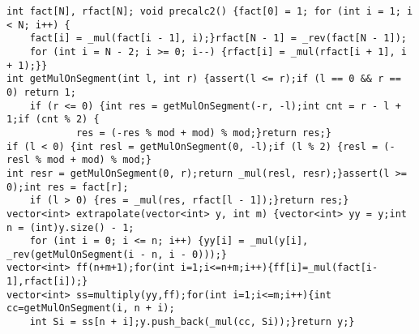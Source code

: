 \documentclass[12pt]{article}
\begin{document}
\begin{verbatim}
int fact[N], rfact[N]; void precalc2() {fact[0] = 1; for (int i = 1; i < N; i++) {
    fact[i] = _mul(fact[i - 1], i);}rfact[N - 1] = _rev(fact[N - 1]);
    for (int i = N - 2; i >= 0; i--) {rfact[i] = _mul(rfact[i + 1], i + 1);}}
int getMulOnSegment(int l, int r) {assert(l <= r);if (l == 0 && r == 0) return 1;
    if (r <= 0) {int res = getMulOnSegment(-r, -l);int cnt = r - l + 1;if (cnt % 2) {
            res = (-res % mod + mod) % mod;}return res;}
if (l < 0) {int resl = getMulOnSegment(0, -l);if (l % 2) {resl = (-resl % mod + mod) % mod;}
int resr = getMulOnSegment(0, r);return _mul(resl, resr);}assert(l >= 0);int res = fact[r];
    if (l > 0) {res = _mul(res, rfact[l - 1]);}return res;}
vector<int> extrapolate(vector<int> y, int m) {vector<int> yy = y;int n = (int)y.size() - 1;
    for (int i = 0; i <= n; i++) {yy[i] = _mul(y[i], _rev(getMulOnSegment(i - n, i - 0)));}
vector<int> ff(n+m+1);for(int i=1;i<=n+m;i++){ff[i]=_mul(fact[i-1],rfact[i]);}
vector<int> ss=multiply(yy,ff);for(int i=1;i<=m;i++){int cc=getMulOnSegment(i, n + i);
    int Si = ss[n + i];y.push_back(_mul(cc, Si));}return y;}
\end{verbatim}

\end{document}

